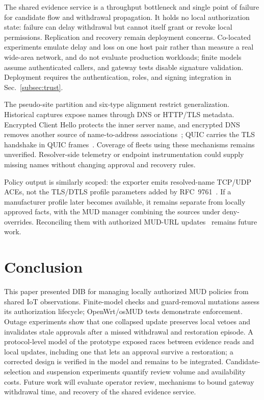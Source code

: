 \documentclass[journal]{IEEEtran}
\theoremstyle{definition}
\begin{document}
The shared evidence service is a throughput bottleneck and single point of failure for candidate flow and withdrawal propagation. It holds no local authorization state: failure can delay withdrawal but cannot itself grant or revoke local permissions. Replication and recovery remain deployment concerns. Co-located experiments emulate delay and loss on one host pair rather than measure a real wide-area network, and do not evaluate production workloads; finite models assume authenticated callers, and gateway tests disable signature validation. Deployment requires the authentication, roles, and signing integration in Sec.~\ref{subsec:trust}.

The pseudo-site partition and six-type alignment restrict generalization. Historical captures expose names through DNS or HTTP/TLS metadata. Encrypted Client Hello protects the inner server name, and encrypted DNS removes another source of name-to-address associations~\cite{rfc9849}; QUIC carries the TLS handshake in QUIC frames~\cite{rfc9001}. Coverage of fleets using these mechanisms remains unverified. Resolver-side telemetry or endpoint instrumentation could supply missing names without changing approval and recovery rules.

Policy output is similarly scoped: the exporter emits resolved-name TCP/UDP ACEs, not the TLS/DTLS profile parameters added by RFC~9761~\cite{rfc9761}. If a manufacturer profile later becomes available, it remains separate from locally approved facts, with the MUD manager combining the sources under deny-overrides. Reconciling them with authorized MUD-URL updates~\cite{mudacceptableurls} remains future work.



\section{Conclusion}
\label{sec:conclusion}
This paper presented DIB for managing locally authorized MUD policies from shared IoT observations. Finite-model checks and guard-removal mutations assess its authorization lifecycle; OpenWrt/osMUD tests demonstrate enforcement. Outage experiments show that one collapsed update preserves local vetoes and invalidates stale approvals after a missed withdrawal and restoration episode. A protocol-level model of the prototype exposed races between evidence reads and local updates, including one that lets an approval survive a restoration; a corrected design is verified in the model and remains to be integrated. Candidate-selection and suspension experiments quantify review volume and availability costs. Future work will evaluate operator review, mechanisms to bound gateway withdrawal time, and recovery of the shared evidence service.
\end{document}
